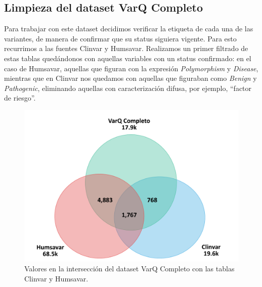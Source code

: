 \subsection{Limpieza del dataset VarQ Completo}

Para trabajar con este dataset decidimos verificar la etiqueta de cada una de las variantes, de manera de confirmar que su status siguiera vigente. Para esto recurrimos a las fuentes Clinvar y Humsavar. Realizamos un primer filtrado de estas tablas quedándonos con aquellas variables con un status confirmado: en el caso de Humsavar, aquellas que figuran con la expresión \textit{Polymorphism} y \textit{Disease}, mientras que en Clinvar nos quedamos con aquellas que figuraban como \textit{Benign} y \textit{Pathogenic}, eliminando aquellas con caracterización difusa, por ejemplo, ``factor de riesgo''. 

\begin{figure}[H]
    \centering
    \includegraphics[scale=0.4]{documents/latex/figures/3/varq/interseccion_varq.pdf}
    \caption{Valores en la intersección del dataset VarQ Completo con las tablas Clinvar y Humsavar.}
    \label{fig:interseccion_varq}
\end{figure}


